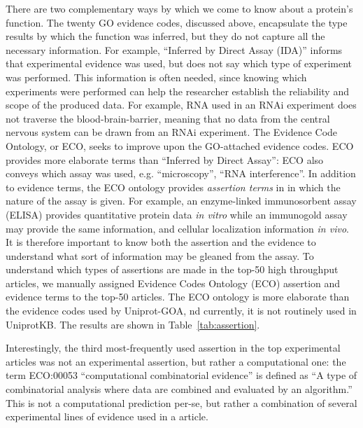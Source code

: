 \documentclass[12pt]{article}
\begin{document}
There are two complementary ways by which we come to know about a protein's
function.  The twenty GO evidence codes, discussed above, encapsulate the type results
by which the function was inferred, but they do not capture all the necessary
information. For example, ``Inferred by Direct Assay (IDA)'' informs that
experimental evidence was used, but does not say which type of experiment was
performed.  This information is often needed, since knowing which experiments were
performed can help the researcher establish the reliability and scope of the
produced data. For example, RNA used in an  RNAi experiment does not traverse the
blood-brain-barrier, meaning that no data from the central nervous system can be
drawn from an RNAi experiment. The Evidence Code Ontology, or ECO, seeks to improve
upon the GO-attached evidence codes. ECO provides more elaborate terms than
``Inferred by Direct Assay'': ECO also conveys which assay was used, e.g.
``microscopy'', ``RNA interference''.  In addition to evidence terms, the ECO
ontology provides \textit{assertion terms} in in which the nature of the assay is
given. For example, an enzyme-linked immunosorbent assay (ELISA) provides
quantitative protein data \textit{in vitro} while an immunogold assay may provide
the same information, and cellular localization information \textit{in vivo}. It is
therefore important to know both the assertion and the evidence to understand what
sort of information may be gleaned from the assay. To understand which types of
assertions are made in the top-50 high throughput articles, we manually assigned
Evidence Codes Ontology (ECO) assertion and evidence terms to the top-50 articles.
The ECO ontology is more elaborate than the evidence codes used by Uniprot-GOA, nd
currently, it is not routinely used in UniprotKB.  The results are shown in
Table~\ref{tab:assertion}.

Interestingly, the third most-frequently used assertion in the top experimental
articles was not an experimental assertion, but rather a computational one: the term
ECO:00053 ``computational combinatorial evidence'' is defined as ``A type of combinatorial
analysis where data are combined and evaluated by an algorithm.'' This is not a
computational prediction per-se, but rather a combination of several experimental lines of
evidence used in a article.
\end{document}
